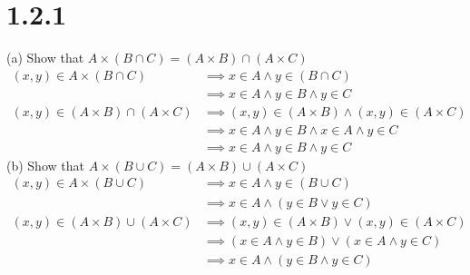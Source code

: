 \documentclass{article}
\begin{document}
\section*{1.2.1}
(a) Show that $A \times (B \cap C) = (A \times B) \cap (A \times C)$
\begin{align*}
    (x, y) \in A \times (B \cap C) &\implies x \in A \wedge y \in (B \cap C)\\
    &\implies x \in A \wedge y \in B \wedge y \in C\\
    (x, y) \in (A \times B) \cap (A \times C)&\implies (x, y) \in (A \times B) \wedge (x, y) \in (A \times C)\\
    &\implies x \in A \wedge y \in B \wedge x \in A \wedge y \in C\\
    &\implies x \in A \wedge y \in B \wedge y \in C
\end{align*}
(b) Show that $A \times (B \cup C) = (A \times B) \cup (A \times C)$
\begin{align*}
    (x, y) \in A \times (B \cup C) &\implies x \in A \wedge y \in (B \cup C)\\
    &\implies x \in A \wedge (y \in B \vee y \in C)\\
    (x, y) \in (A \times B) \cup (A \times C)&\implies (x, y) \in (A \times B) \vee (x, y) \in (A \times C)\\
    &\implies (x \in A \wedge y \in B) \vee (x \in A \wedge y \in C)\\
    &\implies x \in A \wedge (y \in B \wedge y \in C)
\end{align*}
\end{document}
